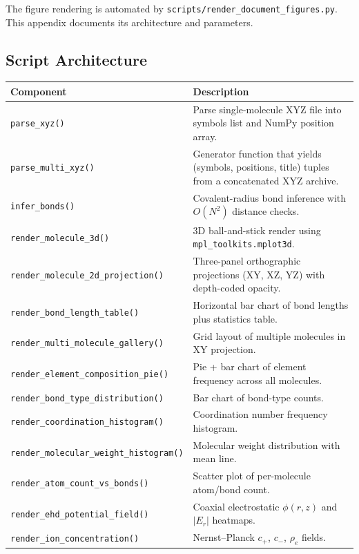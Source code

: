 \documentclass[11pt,a4paper]{article}
\begin{document}
The figure rendering is automated by
\texttt{scripts/render\_document\_figures.py}.  This appendix documents
its architecture and parameters.

\subsection{Script Architecture}

\begin{center}
\begin{tabular}{lp{10cm}}
\toprule
\textbf{Component} & \textbf{Description} \\
\midrule
\texttt{parse\_xyz()} & Parse single-molecule XYZ file into symbols list and
  NumPy position array. \\
\texttt{parse\_multi\_xyz()} & Generator function that yields (symbols, positions,
  title) tuples from a concatenated XYZ archive. \\
\texttt{infer\_bonds()} & Covalent-radius bond inference with $O(N^2)$
  distance checks. \\
\texttt{render\_molecule\_3d()} & 3D ball-and-stick render using
  \texttt{mpl\_toolkits.mplot3d}. \\
\texttt{render\_molecule\_2d\_projection()} & Three-panel orthographic
  projections (XY, XZ, YZ) with depth-coded opacity. \\
\texttt{render\_bond\_length\_table()} & Horizontal bar chart of bond
  lengths plus statistics table. \\
\texttt{render\_multi\_molecule\_gallery()} & Grid layout of multiple
  molecules in XY projection. \\
\texttt{render\_element\_composition\_pie()} & Pie + bar chart of element
  frequency across all molecules. \\
\texttt{render\_bond\_type\_distribution()} & Bar chart of bond-type
  counts. \\
\texttt{render\_coordination\_histogram()} & Coordination number frequency
  histogram. \\
\texttt{render\_molecular\_weight\_histogram()} & Molecular weight
  distribution with mean line. \\
\texttt{render\_atom\_count\_vs\_bonds()} & Scatter plot of per-molecule
  atom/bond count. \\
\texttt{render\_ehd\_potential\_field()} & Coaxial electrostatic $\phi(r,z)$
  and $|E_r|$ heatmaps. \\
\texttt{render\_ion\_concentration()} & Nernst--Planck $c_+$, $c_-$,
  $\rho_e$ fields. \\

\end{tabular}
\end{center}
\end{document}
